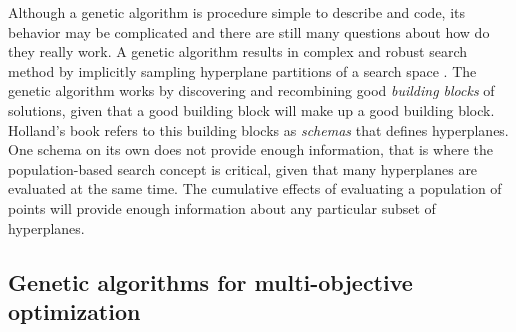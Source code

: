     Although a genetic algorithm is procedure simple to describe and code, its behavior may be complicated and there are still many questions about how do they really work. A genetic algorithm results in complex and robust search method by implicitly sampling hyperplane partitions of a search space \cite{whitley1994genetic}.
    The genetic algorithm works by discovering and recombining good \textit{building blocks} of solutions, given that a good building block will make up a good building block.
    Holland's book \cite{john1992holland} refers to this building blocks as \textit{schemas} that defines hyperplanes. One schema on its own does not provide enough information, that is where the population-based search concept is critical, given that many hyperplanes are evaluated at the same time. The cumulative effects of evaluating a population of points will provide enough information about any particular subset of hyperplanes.

\newpage

\subsection{Genetic algorithms for multi-objective optimization}
        
